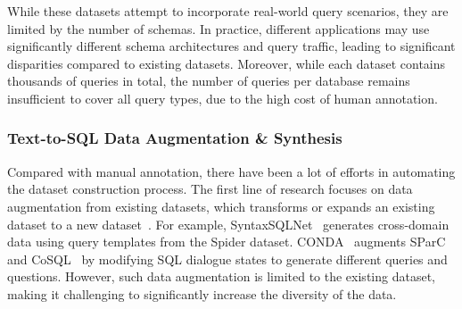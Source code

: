 While these datasets attempt to incorporate real-world query scenarios, they are limited by the number of schemas. In practice, different applications may use significantly different schema architectures and query traffic, leading to significant disparities compared to existing datasets. Moreover, while each dataset contains thousands of queries in total, the number of queries per database remains insufficient to cover all query types, due to the high cost of human annotation.










\subsubsection{Text-to-SQL Data Augmentation \& Synthesis} Compared with manual annotation, there have been a lot of efforts in automating the dataset construction process. The first line of research focuses on data augmentation from existing datasets, which transforms or expands an existing dataset to a new dataset~\cite{syntaxsqlnet, conda, nlp_synthetic_1, nlp_synthetic_2, nlp_synthetic_3, nlp_synthetic_4}.
For example, SyntaxSQLNet~\cite{syntaxsqlnet} generates cross-domain data using query templates from the Spider dataset. CONDA~\cite{conda} augments SParC~\cite{sparc} and CoSQL~\cite{cosql} by modifying SQL dialogue states to generate different queries and questions.
However, such data augmentation is limited to the existing dataset, making it challenging to significantly increase the diversity of the data.

